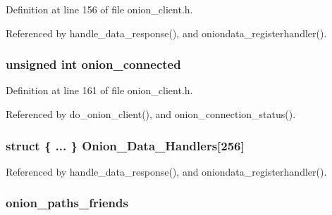 Definition at line 156 of file onion\+\_\+client.\+h.



Referenced by handle\+\_\+data\+\_\+response(), and oniondata\+\_\+registerhandler().

\hypertarget{struct_onion___client_a1a57f09aaa51824a5069ba1503d52513}{
\subsubsection[{onion\+\_\+connected}]{\setlength{\rightskip}{0pt plus 5cm}unsigned int onion\+\_\+connected}}\label{struct_onion___client_a1a57f09aaa51824a5069ba1503d52513}


Definition at line 161 of file onion\+\_\+client.\+h.



Referenced by do\+\_\+onion\+\_\+client(), and onion\+\_\+connection\+\_\+status().

\hypertarget{struct_onion___client_a8576150a4360326b1a759d4bfc7c5e59}{
\subsubsection[{Onion\+\_\+\+Data\+\_\+\+Handlers}]{\setlength{\rightskip}{0pt plus 5cm}struct \{ ... \}   Onion\+\_\+\+Data\+\_\+\+Handlers\mbox{[}256\mbox{]}}}\label{struct_onion___client_a8576150a4360326b1a759d4bfc7c5e59}


Referenced by handle\+\_\+data\+\_\+response(), and oniondata\+\_\+registerhandler().

\hypertarget{struct_onion___client_a52bae59a292facb41ff98ea0efe8e68f}{
\subsubsection[{onion\+\_\+paths\+\_\+friends}]{ onion\+\_\+paths\+\_\+friends}}\label{struct_onion___client_a52bae59a292facb41ff98ea0efe8e68f}


